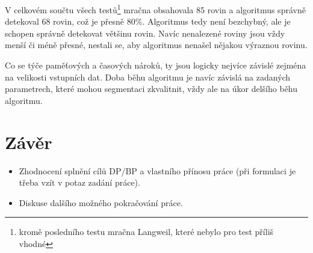 \documentclass[11pt,twoside,a4paper]{book}
\begin{document}
V celkovém součtu všech testů\footnote{kromě posledního testu mračna Langweil, které nebylo pro test příliš vhodné} mračna obsahovala 85 rovin a algoritmus správně detekoval 68 rovin, což je přesně 80\%. Algoritmus tedy není bezchybný, ale je schopen správně detekovat většinu rovin. Navíc nenalezené roviny jsou vždy menší či méně přesné, nestali se, aby algoritmus nenašel nějakou výraznou rovinu.

Co se týče paměťových a časových nároků, ty jsou logicky nejvíce závislé zejména na velikosti vstupních dat. Doba běhu algoritmu je navíc závislá na zadaných parametrech, které mohou segmentaci zkvalitnit, vždy ale na úkor delšího běhu algoritmu.


\chapter{Závěr}

\begin{itemize}
\item Zhodnocení splnění cílů DP/BP a  vlastního přínosu práce (při formulaci je třeba vzít v potaz zadání práce).
\item Diskuse dalšího možného pokračování práce.
\end{itemize} 


%




%
\def\CS{$\cal C\kern-0.1667em\lower.5ex\hbox{$\cal S$}\kern-0.075em $}


%
\end{document}
